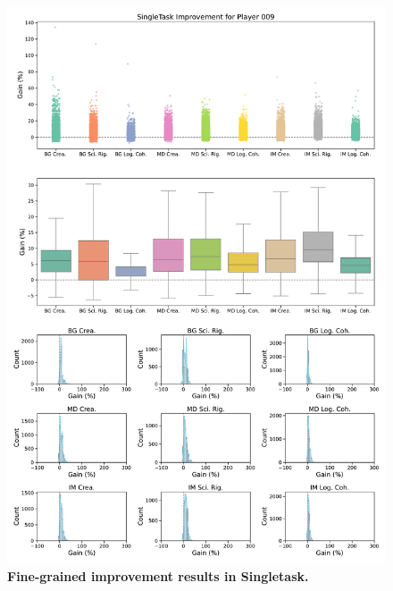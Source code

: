 \begin{figure}[ht]
  \centering
  \includegraphics[width=\textwidth]{figures/gain_validity/singletask/singletask_gain_player_00009.pdf}
  \caption{\textbf{Fine-grained improvement results in Singletask.}}
  \label{fig:singletask_gain_all}
\end{figure}
